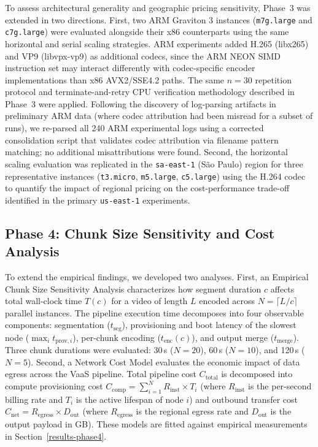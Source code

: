 \documentclass[conference]{IEEEtran}
\begin{document}
To assess architectural generality and geographic pricing sensitivity, Phase~3 was extended in two directions. First, two ARM Graviton 3 instances (\texttt{m7g.large} and \texttt{c7g.large}) were evaluated alongside their x86 counterparts using the same horizontal and serial scaling strategies. ARM experiments added H.265 (libx265) and VP9 (libvpx-vp9) as additional codecs, since the ARM NEON SIMD instruction set may interact differently with codec-specific encoder implementations than x86 AVX2/SSE4.2 paths. The same $n=30$ repetition protocol and terminate-and-retry CPU verification methodology described in Phase~3 were applied. Following the discovery of log-parsing artifacts in preliminary ARM data (where codec attribution had been misread for a subset of runs), we re-parsed all 240 ARM experimental logs using a corrected consolidation script that validates codec attribution via filename pattern matching; no additional misattributions were found. Second, the horizontal scaling evaluation was replicated in the \texttt{sa-east-1} (São Paulo) region for three representative instances (\texttt{t3.micro}, \texttt{m5.large}, \texttt{c5.large}) using the H.264 codec to quantify the impact of regional pricing on the cost-performance trade-off identified in the primary \texttt{us-east-1} experiments.

\subsection{Phase 4: Chunk Size Sensitivity and Cost Analysis}

To extend the empirical findings, we developed two analyses. First, an Empirical Chunk Size Sensitivity Analysis characterizes how segment duration $c$ affects total wall-clock time $T(c)$ for a video of length $L$ encoded across $N = \lceil L/c \rceil$ parallel instances. The pipeline execution time decomposes into four observable components: segmentation ($t_{\text{seg}}$), provisioning and boot latency of the slowest node ($\max_i t_{\text{prov},i}$), per-chunk encoding ($t_{\text{enc}}(c)$), and output merge ($t_{\text{merge}}$). Three chunk durations were evaluated: 30\,s ($N=20$), 60\,s ($N=10$), and 120\,s ($N=5$). Second, a Network Cost Model evaluates the economic impact of data egress across the VaaS pipeline. Total pipeline cost $C_{\text{total}}$ is decomposed into compute provisioning cost $C_{\text{comp}} = \sum_{i=1}^{N} R_{\text{inst}} \times T_i$ (where $R_{\text{inst}}$ is the per-second billing rate and $T_i$ is the active lifespan of node $i$) and outbound transfer cost $C_{\text{net}} = R_{\text{egress}} \times D_{\text{out}}$ (where $R_{\text{egress}}$ is the regional egress rate and $D_{\text{out}}$ is the output payload in GB). These models are fitted against empirical measurements in Section~\ref{results-phase4}.
\end{document}
